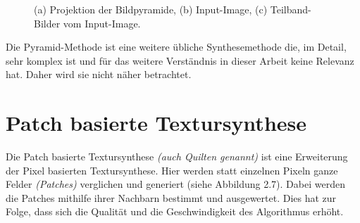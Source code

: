 \documentclass[12pt, a4paper,twoside,openany]{report} %
\begin{document}
\begin{figure}[H]
    \centering
    \qquad
    \qquad
    \caption{(a) Projektion der Bildpyramide, (b) Input-Image, (c) Teilband-Bilder vom Input-Image.}%
\end{figure}

Die Pyramid-Methode ist eine weitere übliche Synthesemethode die, im Detail, sehr komplex ist und für das weitere Verständnis in dieser Arbeit keine Relevanz hat.
Daher wird sie nicht näher betrachtet.

\section{Patch basierte Textursynthese}

Die Patch basierte Textursynthese \textit{(auch Quilten genannt)} ist eine Erweiterung der Pixel basierten Textursynthese.
Hier werden statt einzelnen Pixeln ganze Felder \textit{(Patches)} verglichen und generiert {(siehe Abbildung 2.7)}.
Dabei werden die Patches mithilfe ihrer Nachbarn bestimmt und ausgewertet.
Dies hat zur Folge, dass sich die Qualität und die Geschwindigkeit des Algorithmus erhöht.
\end{document}
